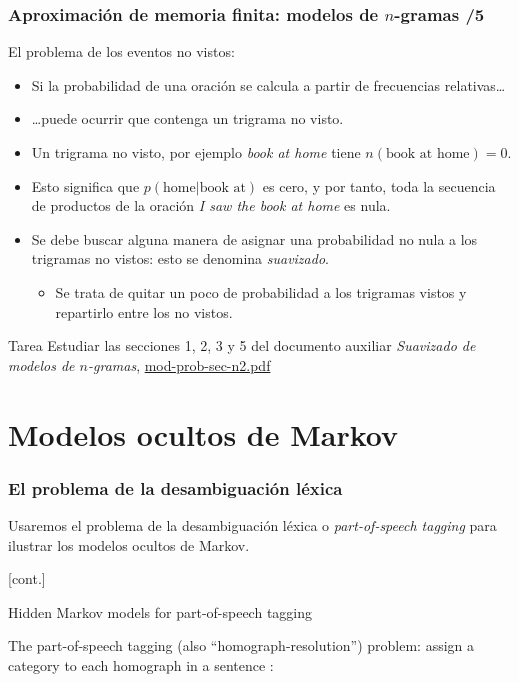 \begin{frame}
\frametitle{Aproximación de memoria finita: modelos de \(n\)-gramas /5} 
El problema de los eventos no vistos:
\begin{itemize}
\item Si la probabilidad de una oración se calcula a partir de frecuencias relativas\ldots
\item \ldots puede ocurrir que contenga un trigrama no visto.
\item Un trigrama no visto, por ejemplo \emph{book at home} tiene \(n(\mbox{book at home})=0\).
\item Esto significa que \(p(\mbox{home}|\mbox{book at})\) es cero, y por tanto, toda la secuencia de productos de la oración \emph{I saw the book at home} es nula.
\item Se debe buscar alguna manera de asignar una probabilidad no nula a los trigramas no vistos: esto se denomina \emph{suavizado}.
  \begin{itemize}
  \item Se trata de quitar un poco de probabilidad a los trigramas vistos y repartirlo entre los no vistos.
  \end{itemize}
\end{itemize}
  \begin{block}{Tarea}
    Estudiar las secciones 1, 2, 3 y 5 
    del documento auxiliar \emph{Suavizado de modelos de \(n\)-gramas}, \url{mod-prob-sec-n2.pdf}
  \end{block}
\end{frame}

\section{Modelos ocultos de Markov}
\begin{frame}
  \frametitle{El problema de la desambiguación léxica}
Usaremos el problema de la desambiguación léxica o \emph{part-of-speech tagging} para ilustrar los modelos ocultos de Markov.

[cont.]
\end{frame}
















Hidden Markov models for part-of-speech tagging

The part-of-speech tagging (also “homograph-resolution”) problem: assign a category to each homograph in a sentence :

